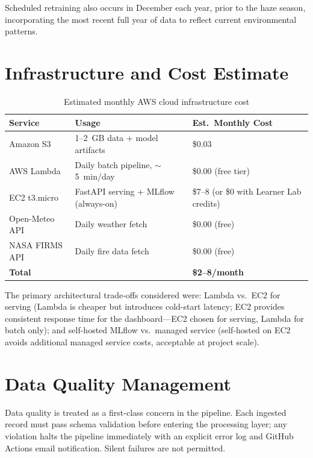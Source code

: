 \documentclass[12pt,a4paper]{report}
\begin{document}
Scheduled retraining also occurs in December each year, prior to the haze season, incorporating the most recent full year of data to reflect current environmental patterns.

\section{Infrastructure and Cost Estimate}

\begin{table}[H]
\centering
\caption{Estimated monthly AWS cloud infrastructure cost}
\label{tab:cost}
\begin{tabularx}{\textwidth}{@{}p{3cm}Xp{4cm}@{}}
\toprule
\textbf{Service} & \textbf{Usage} & \textbf{Est.\ Monthly Cost} \\
\midrule
Amazon S3           & 1--2~GB data + model artifacts            & \$0.03 \\
AWS Lambda          & Daily batch pipeline, $\sim$5~min/day     & \$0.00 (free tier) \\
EC2 t3.micro        & FastAPI serving + MLflow (always-on)      & \$7--8 (or \$0 with Learner Lab credits) \\
Open-Meteo API      & Daily weather fetch                       & \$0.00 (free) \\
NASA FIRMS API      & Daily fire data fetch                     & \$0.00 (free) \\
\midrule
\textbf{Total}      &                                           & \textbf{\$2--8/month} \\
\bottomrule
\end{tabularx}
\end{table}

The primary architectural trade-offs considered were: Lambda vs.\ EC2 for serving (Lambda is cheaper but introduces cold-start latency; EC2 provides consistent response time for the dashboard---EC2 chosen for serving, Lambda for batch only); and self-hosted MLflow vs.\ managed service (self-hosted on EC2 avoids additional managed service costs, acceptable at project scale).

\section{Data Quality Management}

Data quality is treated as a first-class concern in the pipeline. Each ingested record must pass schema validation before entering the processing layer; any violation halts the pipeline immediately with an explicit error log and GitHub Actions email notification. Silent failures are not permitted.
\end{document}
